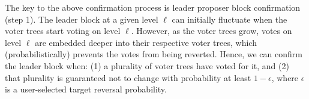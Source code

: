 

\smallskip
The key to the above confirmation process is leader proposer block confirmation (step 1).
The leader block at a given level $\ell$ can initially fluctuate when the voter trees start voting on level $\ell$. 
However, as the voter trees grow, votes on level $\ell$ are embedded deeper into their respective voter trees, which (probabilistically) prevents the votes from being reverted.
Hence, we can confirm the leader block when: (1) a plurality of voter trees have voted for it, and (2) that plurality is guaranteed not to change with probability at least $1-\epsilon$, where $\epsilon$ is a user-selected target reversal probability.


